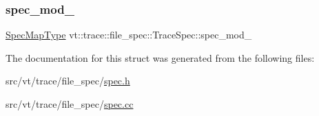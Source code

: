 \mbox{\label{structvt_1_1trace_1_1file__spec_1_1_trace_spec_aae4873bc7f4d6ae6c33098670c8a550e}} 
\subsubsection{\texorpdfstring{spec\+\_\+mod\+\_\+}{spec\_mod\_}}
{\footnotesize\ttfamily \hyperlink{structvt_1_1trace_1_1file__spec_1_1_trace_spec_a155d6b881e8d69a4644823789788ce5c}{Spec\+Map\+Type} vt\+::trace\+::file\+\_\+spec\+::\+Trace\+Spec\+::spec\+\_\+mod\+\_\+\hspace{0.3cm}{\ttfamily [private]}}



The documentation for this struct was generated from the following files\+:\begin{DoxyCompactItemize}
\item 
src/vt/trace/file\+\_\+spec/\hyperlink{spec_8h}{spec.\+h}\item 
src/vt/trace/file\+\_\+spec/\hyperlink{spec_8cc}{spec.\+cc}\end{DoxyCompactItemize}
